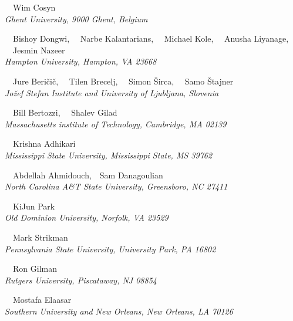 \begin{center}
{~~Wim Cosyn}\\
\ls
{\normalsize\it{Ghent University, 9000 Ghent, Belgium}}

\vspace{10px}

{~~Bishoy Dongwi,
~~Narbe Kalantarians,
~~Michael Kole,
~~Anusha Liyanage,
~~Jesmin Nazeer}\\
\ls
{\normalsize\it{Hampton University, Hampton, VA 23668}}

\vspace{10px}

{~~Jure Beri\v{c}i\v{c}, 
~~Tilen Brecelj, 
~~Simon \v{S}irca, 
~~Samo \v{S}tajner} \\
\ls
{\normalsize\it{Jo\v{z}ef Stefan Institute and University of Ljubljana, Slovenia}}

\vspace{10px}

{~~Bill Bertozzi,
~~Shalev Gilad}\\
\ls
{\normalsize\it{Massachusetts institute of Technology, Cambridge, MA 02139}}

\vspace{10px}

{~~Krishna Adhikari}\\
\ls
{\normalsize\it{Mississippi State University, Mississippi State, MS 39762}}

\vspace{10px}

{~~Abdellah Ahmidouch,~~Sam Danagoulian}\\
\ls
{\normalsize\it{North Carolina A\&T State University, Greensboro, NC 27411}}

\vspace{10px}

{~~KiJun Park}\\
\ls
{\normalsize\it{Old Dominion University, Norfolk, VA 23529}}

\vspace{10px}

{~~Mark Strikman}\\
\ls
{\normalsize\it{Pennsylvania State University, University Park, PA 16802}}

\vspace{10px}

{~~Ron Gilman}\\
\ls
{\normalsize\it{Rutgers University, Piscataway, NJ 08854}}

\vspace{10px}


{~~Mostafa Elaasar}\\
\ls
{\normalsize\it{Southern University and New Orleans, New Orleans, LA 70126}}


\end{center}

